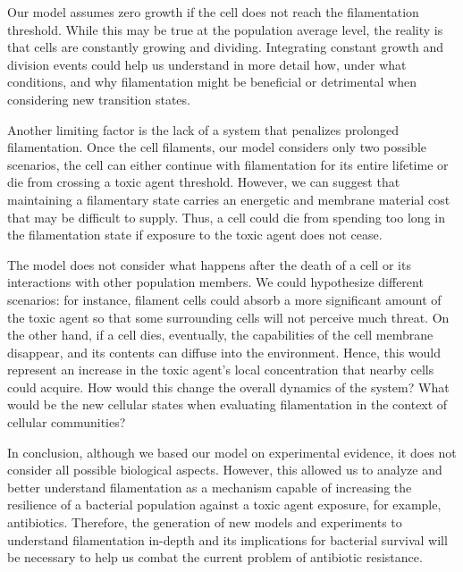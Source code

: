 \documentclass[
  12pt,
  a4paper,
  oneside]{krantz}
\begin{document}
Our model assumes zero growth if the cell does not reach the
filamentation threshold. While this may be true at the population
average level, the reality is that cells are constantly growing and
dividing. Integrating constant growth and division events could help us
understand in more detail how, under what conditions, and why
filamentation might be beneficial or detrimental when considering new
transition states.

Another limiting factor is the lack of a system that penalizes prolonged
filamentation. Once the cell filaments, our model considers only two
possible scenarios, the cell can either continue with filamentation for
its entire lifetime or die from crossing a toxic agent threshold.
However, we can suggest that maintaining a filamentary state carries an
energetic and membrane material cost that may be difficult to supply.
Thus, a cell could die from spending too long in the filamentation state
if exposure to the toxic agent does not cease.

The model does not consider what happens after the death of a cell or
its interactions with other population members. We could hypothesize
different scenarios: for instance, filament cells could absorb a more
significant amount of the toxic agent so that some surrounding cells
will not perceive much threat. On the other hand, if a cell dies,
eventually, the capabilities of the cell membrane disappear, and its
contents can diffuse into the environment. Hence, this would represent
an increase in the toxic agent's local concentration that nearby cells
could acquire. How would this change the overall dynamics of the system?
What would be the new cellular states when evaluating filamentation in
the context of cellular communities?

In conclusion, although we based our model on experimental evidence, it
does not consider all possible biological aspects. However, this allowed
us to analyze and better understand filamentation as a mechanism capable
of increasing the resilience of a bacterial population against a toxic
agent exposure, for example, antibiotics. Therefore, the generation of
new models and experiments to understand filamentation in-depth and its
implications for bacterial survival will be necessary to help us combat
the current problem of antibiotic resistance.

\cleardoublepage

\hypertarget{appendix-appendix}{%
\appendix {}}
\end{document}
